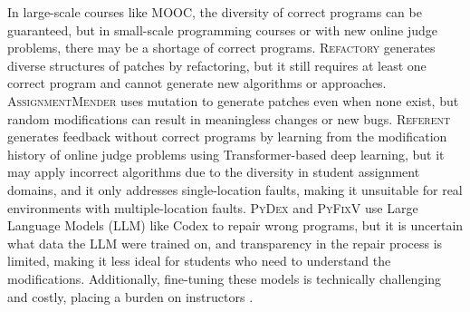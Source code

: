 \documentclass[10pt,conference]{IEEEtran}
\begin{document}
    In large-scale courses like MOOC, the diversity of correct programs can be guaranteed, but in small-scale programming courses or with new online judge problems, there may be a shortage of correct programs. \textsc{Refactory} \cite{hu2019re} generates diverse structures of patches by refactoring, but it still requires at least one correct program and cannot generate new algorithms or approaches. \textsc{AssignmentMender} \cite{li2022generating} uses mutation to generate patches even when none exist, but random modifications can result in meaningless changes or new bugs. \textsc{Referent} \cite{heo2023referent} generates feedback without correct programs by learning from the modification history of online judge problems using Transformer-based deep learning, but it may apply incorrect algorithms due to the diversity in student assignment domains, and it only addresses single-location faults, making it unsuitable for real environments with multiple-location faults. \textsc{PyDex} \cite{zhang2024pydex} and \textsc{PyFixV} \cite{phung2023generating} use Large Language Models (LLM) like Codex to repair wrong programs, but it is uncertain what data the LLM were trained on, and transparency in the repair process is limited, making it less ideal for students who need to understand the modifications. Additionally, fine-tuning these models is technically challenging and costly, placing a burden on instructors \cite{joshi2023repair}.
\end{document}

